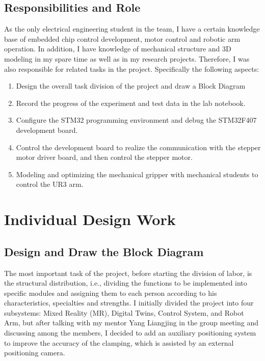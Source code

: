 \documentclass{senior-design-individual}
\begin{document}
\section{Responsibilities and Role}
As the only electrical engineering student in the team, I have a certain knowledge base of embedded chip control development, motor control and robotic arm operation. In addition, I have knowledge of mechanical structure and 3D modeling in my spare time as well as in my research projects. Therefore, I was also responsible for related tasks in the project. Specifically the following aspects:
\begin{enumerate}
    \item Design the overall task division of the project and draw a Block Diagram
    \item Record the progress of the experiment and test data in the lab notebook.
    \item Configure the STM32 programming environment and debug the STM32F407 development board.
    \item Control the development board to realize the communication with the stepper motor driver board, and then control the stepper motor.
    \item Modeling and optimizing the mechanical gripper with mechanical students to control the UR3 arm.
\end{enumerate}
\chapter{Individual Design Work}
\section{Design and Draw the Block Diagram}
The most important task of the project, before starting the division of labor, 
is the structural distribution, i.e., dividing the functions to be implemented 
into specific modules and assigning them to each person according to his 
characteristics, specialties and strengths. I initially divided the project 
into four subsystems: Mixed Reality (MR), Digital Twins, Control System, and Robot 
Arm, but after talking with my mentor Yang Liangjing in the group meeting and 
discussing among the members, I decided to add an auxiliary positioning system 
to improve the accuracy of the clamping, which is assisted by an external 
positioning camera. 
 
\end{document}
